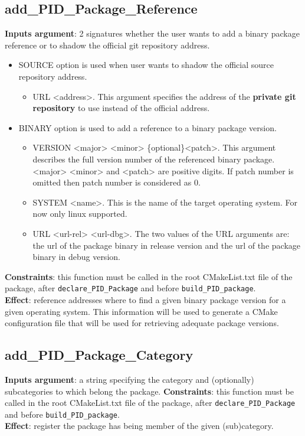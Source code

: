 \documentclass[12pt,a4paper]{article}
\begin{document}
\subsection{add\_PID\_Package\_Reference}
\label{sec:PIDCMakefunctionsAPI_add_reference}
\textbf{Inputs argument}:  2 signatures whether the user wants to add a binary package reference or to shadow the official git repository address.
\begin{itemize}
\item SOURCE option is used when user wants to shadow the official source repository address.
\begin{itemize}
\item URL <address>. This argument specifies the address of the \textbf{private git repository} to use instead of the official address.
\end{itemize}
\item BINARY option is used to add a reference to a binary package version.
\begin{itemize}
\item VERSION <major> <minor> \{optional\}<patch>. This argument describes the full version number of the referenced binary package. <major> <minor> and <patch> are positive digits. If patch number is omitted then patch number is considered as 0.
\item SYSTEM <name>. This is the name of the target operating system. For now only linux supported.
\item URL <url-rel> <url-dbg>. The two values of the URL arguments are: the url of the package binary in release version and the url of the package binary in debug version.
\end{itemize}
\end{itemize}

\textbf{Constraints}: this function must be called in the root CMakeList.txt file of the package, after \texttt{declare\_PID\_Package} and before \texttt{build\_PID\_package}.\\
\textbf{Effect}: reference addresses where to find a given binary package version for a given operating system. This information will be used to generate a CMake configuration file that will be used for retrieving adequate package versions.

\subsection{add\_PID\_Package\_Category}
\label{sec:PIDCMakefunctionsAPI_add_category}
\textbf{Inputs argument}: a string specifying the category and (optionally) subcategories to which belong the package.
\textbf{Constraints}: this function must be called in the root CMakeList.txt file of the package, after \texttt{declare\_PID\_Package} and before \texttt{build\_PID\_package}.\\
\textbf{Effect}: register the package has being member of the given (sub)category.
\end{document}
